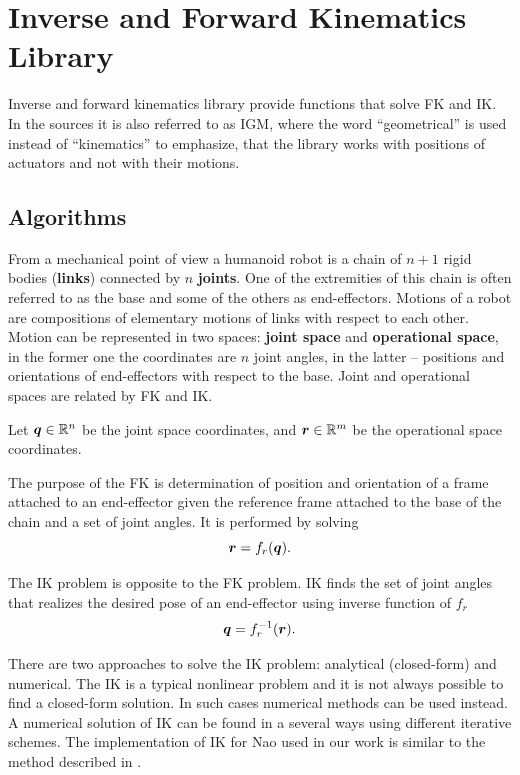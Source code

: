 \section{Inverse and Forward Kinematics Library}\label{sec.ik}
Inverse and forward kinematics library provide functions that solve \ac{FK} and \ac{IK}.
In the sources it is also referred to as \ac{IGM}, where the word ``geometrical'' is used 
instead of ``kinematics'' to emphasize, that the library works with positions of actuators 
and not with their motions.


\subsection{Algorithms}\label{sec.ik_alg}
From a mechanical point of view a humanoid robot is a chain of $n+1$ rigid bodies
({\bf links}) connected by $n$ {\bf joints}. One of the extremities of this chain 
is often referred to as the base and some of the others as end-effectors. Motions 
of a robot are compositions of elementary motions of links with respect to each 
other. Motion can be represented in two spaces: {\bf joint space} and {\bf operational 
space}, in the former one the coordinates are $n$ joint angles, in the latter -- 
positions and orientations of end-effectors with respect to the base. Joint and 
operational spaces are related by \ac{FK} and \ac{IK}.

Let $\mbox{\boldmath $q$} \in \mathbb{R}^n$ be the joint space coordinates, and $\mbox{\boldmath $r$} \in \mathbb{R}^m$ be 
the operational space coordinates.

The purpose of the \ac{FK} is determination of position and orientation 
of a frame attached to an end-effector given the reference frame attached to the base
of the chain and a set of joint angles. It is performed by solving
$$
\mbox{\boldmath $r$} = f_r(\mbox{\boldmath $q$}).
$$

The \ac{IK} problem is opposite to the \ac{FK} problem. \ac{IK} finds the set of joint 
angles that realizes the desired pose of an end-effector using inverse function of $f_r$
$$
\mbox{\boldmath $q$}=f_r^{-1}(\mbox{\boldmath $r$}).
$$

There are two approaches to solve the \ac{IK} problem: analytical (closed-form) and 
numerical. The \ac{IK} is a typical nonlinear problem and it is not always possible to 
find a closed-form solution. In such cases numerical methods can be used instead.
A numerical solution of \ac{IK} can be found in a several ways using different iterative
schemes. The implementation of \ac{IK} for Nao used in our work is similar to the method 
described in \cite{ZhangIKRep}.

